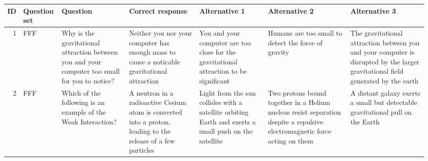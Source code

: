 \documentclass[10pt]{article}
\begin{document}
\begin{tiny}
\begin{longtable}{r|p{0.375in}|p{1.275in}|p{0.75in}|p{0.75in}|p{0.75in}|p{0.75in}}
    
    \textbf{ID} & \textbf{Question set} &                                                                                                                                                                                                                                                                         \textbf{Question} &                                                                                                                                     \textbf{Correct response} &                                                                                                     \textbf{Alternative 1} &                                                                                                                          \textbf{Alternative 2} &                                                                                                                                 \textbf{Alternative 3} \\\hline
    1     &     FFF &                                                                                                                                                                                   Why is the gravitational attraction between you and your computer too small for you to notice? &                                           Neither you nor your computer has enough mass to cause a noticable gravitational attraction &                You and your computer are too close for the gravitational attraction to be significant &                                                                        Humans are too small to detect the force of gravity &  The gravitational attraction between you and your computer is disrupted by the larger gravitational field generated by the earth \\\hline
    2     &     FFF &                                                                                                                                                                                                                    Which of the following is an example of the Weak Interaction? &                          A neutron in a radioactive Cesium atom is converted into a proton, leading to the release of a few particles &  Light from the sun collides with a satellite orbiting Earth and exerts a small push on the satellite &  Two protons bound together in a Helium nucleus resist separation despite a repulsive electromagnetic force acting on them &                                                   A distant galaxy exerts a small but detectable gravitational pull on the  Earth \\\hline

\end{longtable}
\end{tiny}
\end{document}
